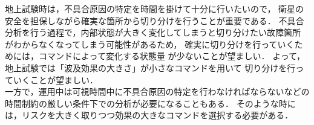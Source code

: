 \documentclass[11pt]{article}
\begin{document}

地上試験時は，不具合原因の特定を時間を掛けて十分に行いたいので，
衛星の安全を担保しながら確実な箇所から切り分けを行うことが重要である．
不具合分析を行う過程で，内部状態が大きく変化してしまうと切り分けたい故障箇所
がわからなくなってしまう可能性があるため，
確実に切り分けを行っていくためには，コマンドによって変化する状態量
が少ないことが望ましい．
よって，地上試験では「波及効果の大きさ」が小さなコマンドを用いて
切り分けを行っていくことが望ましい．\\
一方で，運用中は可視時間中に不具合原因の特定を行わなければならないなどの
時間制約の厳しい条件下での分析が必要になることもある．
そのような時には，リスクを大きく取りつつ効果の大きなコマンドを選択する必要がある．
\end{document}
